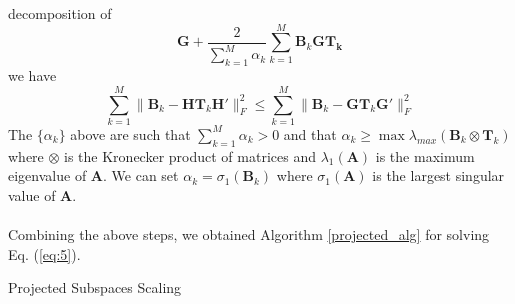 \documentclass[11pt]{asaproc}
\begin{document}
decomposition of
\begin{equation}
  \label{eq:8}
  \mathbf{G} + \frac{2}{\sum_{k=1}^{M} \alpha_k} \sum_{k=1}^{M}
  \mathbf{B}_k \mathbf{G} \mathbf{T_k}
\end{equation}
we have
\begin{equation}
  \label{eq:9}
  \sum_{k=1}^{M} \| \mathbf{B}_k - \mathbf{H}
\mathbf{T}_k \mathbf{H}' \|_F^2 \leq \sum_{k=1}^{M} \|
\mathbf{B}_k - \mathbf{G}
\mathbf{T}_k \mathbf{G}' \|_F^2 
\end{equation}
The $\{\alpha_k\}$ above are such that $\sum_{k=1}^{M}{\alpha_k} > 0$
and that $\alpha_k \geq \max{
  \lambda_{max}(\mathbf{B}_k \otimes \mathbf{T}_k)
}$ where $\otimes$ is the Kronecker product of matrices and
$\lambda_{1}(\mathbf{A})$ is the maximum eigenvalue of
$\mathbf{A}$. We can set $\alpha_k = \sigma_1(\mathbf{B}_k)$
where $\sigma_1(\mathbf{A})$ is the largest singular value of
$\mathbf{A}$. \\ \\

\noindent
Combining the above steps, we obtained Algorithm \ref{projected_alg} for
solving Eq. (\ref{eq:5}). 
\begin{algorithm}
  \dontprintsemicolon
   \caption{Projected Subspaces Scaling}
   \label{projected_alg}
 \end{algorithm}

\end{document}
